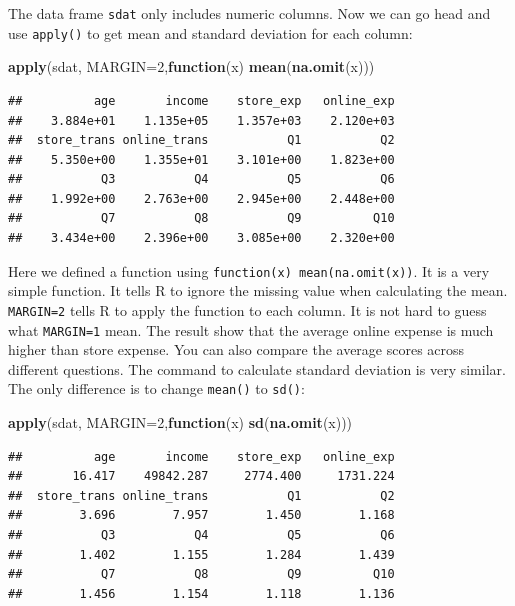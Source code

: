 \documentclass[12pt,]{krantz}
\makeatletter
\newenvironment{Shaded}{\begin{snugshade}}{\end{snugshade}}
\newcommand{\ControlFlowTok}[1]{\textcolor[rgb]{0.27,0.27,0.27}{\textbf{#1}}}
\newcommand{\DataTypeTok}[1]{\textcolor[rgb]{0.27,0.27,0.27}{#1}}
\newcommand{\DecValTok}[1]{\textcolor[rgb]{0.06,0.06,0.06}{#1}}
\newcommand{\KeywordTok}[1]{\textcolor[rgb]{0.27,0.27,0.27}{\textbf{#1}}}
\newcommand{\NormalTok}[1]{#1}
\newenvironment{kframe}{%
\medskip{}
\setlength{\fboxsep}{.8em}
 \def\at@end@of@kframe{}%
 \ifinner\ifhmode%
  \def\at@end@of@kframe{\end{minipage}}%
  \begin{minipage}{\columnwidth}%
 \fi\fi%
 \def\FrameCommand##1{\hskip\@totalleftmargin \hskip-\fboxsep
 \colorbox{shadecolor}{##1}\hskip-\fboxsep
     \hskip-\linewidth \hskip-\@totalleftmargin \hskip\columnwidth}%
 \MakeFramed {\advance\hsize-\width
   \@totalleftmargin\z@ \linewidth\hsize
   \@setminipage}}%
 {\par\unskip\endMakeFramed%
 \at@end@of@kframe}
\renewenvironment{Shaded}{\begin{kframe}}{\end{kframe}}
\makeatother
\begin{document}
The data frame \texttt{sdat} only includes numeric columns. Now we can go head and use \texttt{apply()} to get mean and standard deviation for each column:

\begin{Shaded}
\begin{Highlighting}[]
\KeywordTok{apply}\NormalTok{(sdat, }\DataTypeTok{MARGIN=}\DecValTok{2}\NormalTok{,}\ControlFlowTok{function}\NormalTok{(x) }\KeywordTok{mean}\NormalTok{(}\KeywordTok{na.omit}\NormalTok{(x)))}
\end{Highlighting}
\end{Shaded}

\begin{verbatim}
##          age       income    store_exp   online_exp 
##    3.884e+01    1.135e+05    1.357e+03    2.120e+03 
##  store_trans online_trans           Q1           Q2 
##    5.350e+00    1.355e+01    3.101e+00    1.823e+00 
##           Q3           Q4           Q5           Q6 
##    1.992e+00    2.763e+00    2.945e+00    2.448e+00 
##           Q7           Q8           Q9          Q10 
##    3.434e+00    2.396e+00    3.085e+00    2.320e+00
\end{verbatim}

Here we defined a function using \texttt{function(x)\ mean(na.omit(x))}. It is a very simple function. It tells R to ignore the missing value when calculating the mean. \texttt{MARGIN=2} tells R to apply the function to each column. It is not hard to guess what \texttt{MARGIN=1} mean. The result show that the average online expense is much higher than store expense. You can also compare the average scores across different questions. The command to calculate standard deviation is very similar. The only difference is to change \texttt{mean()} to \texttt{sd()}:

\begin{Shaded}
\begin{Highlighting}[]
\KeywordTok{apply}\NormalTok{(sdat, }\DataTypeTok{MARGIN=}\DecValTok{2}\NormalTok{,}\ControlFlowTok{function}\NormalTok{(x) }\KeywordTok{sd}\NormalTok{(}\KeywordTok{na.omit}\NormalTok{(x)))}
\end{Highlighting}
\end{Shaded}

\begin{verbatim}
##          age       income    store_exp   online_exp 
##       16.417    49842.287     2774.400     1731.224 
##  store_trans online_trans           Q1           Q2 
##        3.696        7.957        1.450        1.168 
##           Q3           Q4           Q5           Q6 
##        1.402        1.155        1.284        1.439 
##           Q7           Q8           Q9          Q10 
##        1.456        1.154        1.118        1.136
\end{verbatim}
\end{document}
